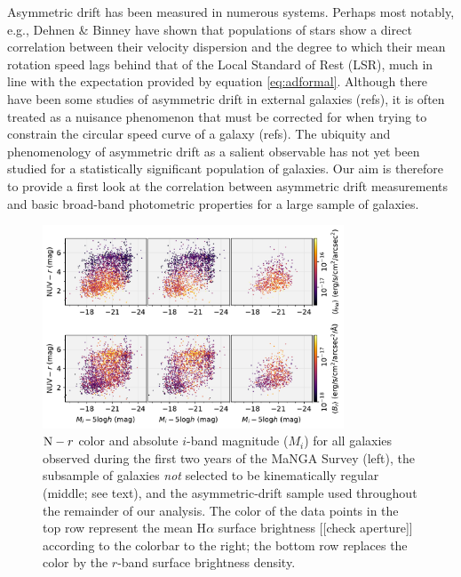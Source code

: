 \documentclass[apj,iop,revtex4,numberedappendix]{emulateapj}
\begin{document}
Asymmetric drift has been measured in numerous systems.  Perhaps most
notably, e.g., Dehnen \& Binney have shown that populations of stars
show a direct correlation between their velocity dispersion and the
degree to which their mean rotation speed lags behind that of the Local
Standard of Rest (LSR), much in line with the expectation provided by
equation \ref{eq:adformal}.  Although there have been some studies of
asymmetric drift in external galaxies (refs), it is often treated as a
nuisance phenomenon that must be corrected for when trying to constrain
the circular speed curve of a galaxy (refs).  The ubiquity and
phenomenology of asymmetric drift as a salient observable has not yet
been studied for a statistically significant population of galaxies.
Our aim is therefore to provide a first look at the correlation between
asymmetric drift measurements and basic broad-band photometric
properties for a large sample of galaxies.

\begin{figure}
%
\begin{center}
%
\includegraphics[width=0.8\textwidth]{figs/cmd_flux.pdf}
%
\end{center}
%
\caption{
%
${\rm N} - r$ color and absolute $i$-band magnitude ($M_i$) for all
galaxies observed during the first two years of the MaNGA Survey (left),
the subsample of galaxies {\em not} selected to be kinematically regular
(middle; see text), and the asymmetric-drift sample used throughout the
remainder of our analysis.  The color of the data points in the top row
represent the mean H$\alpha$ surface brightness [[check aperture]]
according to the colorbar to the right; the bottom row replaces the
color by the $r$-band surface brightness density.
%
}
%
\label{fig:sample}
%
\end{figure}
\end{document}
